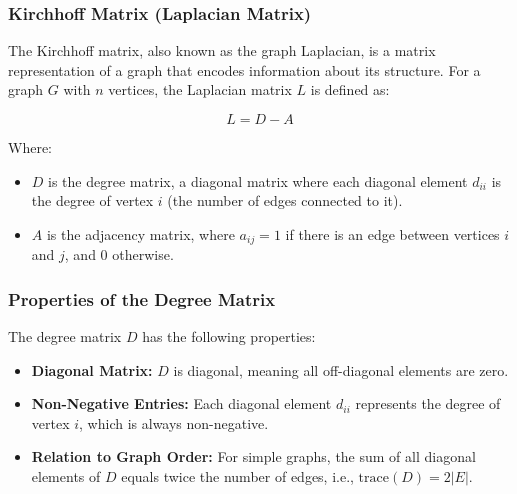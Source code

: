 \documentclass[English, Lau, oneside]{sapthesis}
\begin{document}
\begin{itemize}
\subsubsection{Kirchhoff Matrix (Laplacian Matrix)}
The Kirchhoff matrix, also known as the graph Laplacian, is a matrix representation of a graph that encodes information about its structure. For a graph \( G \) with \( n \) vertices, the Laplacian matrix \( L \) is defined as:

\[
L = D - A
\]

Where:
\begin{itemize}
    \item \( D \) is the degree matrix, a diagonal matrix where each diagonal element \( d_{ii} \) is the degree of vertex \( i \) (the number of edges connected to it).
    \item \( A \) is the adjacency matrix, where \( a_{ij} = 1 \) if there is an edge between vertices \( i \) and \( j \), and \( 0 \) otherwise.
\end{itemize}
\subsubsection{Properties of the Degree Matrix}
The degree matrix \( D \) has the following properties:
\begin{itemize}
    \item \textbf{Diagonal Matrix:} \( D \) is diagonal, meaning all off-diagonal elements are zero.
    \item \textbf{Non-Negative Entries:} Each diagonal element \( d_{ii} \) represents the degree of vertex \( i \), which is always non-negative.
    \item \textbf{Relation to Graph Order:} For simple graphs, the sum of all diagonal elements of \( D \) equals twice the number of edges, i.e., \( \mathrm{trace}(D) = 2|E| \).
\end{itemize}


\end{itemize}
\end{document}

